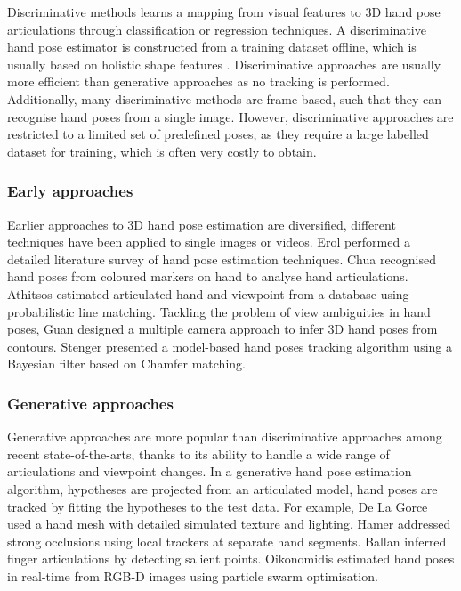 Discriminative methods learns a mapping from visual features to 3D hand pose articulations through classification or regression techniques. A discriminative hand pose estimator is constructed from a training dataset offline, which is usually based on holistic shape features \cite{Rosales2001, Athitsos2003, Romero2009, Wang2009, Keskin2012}. Discriminative approaches are usually more efficient than generative approaches as no tracking is performed. Additionally, many discriminative methods are frame-based, such that they can recognise hand poses from a single image. However, discriminative approaches are restricted to a limited set of predefined poses, as they require a large labelled dataset for training, which is often very costly to obtain.  

\subsubsection{Early approaches} 
Earlier approaches to 3D hand pose estimation are diversified, different techniques have been applied to single images or videos. Erol \etal \cite{Erol2007} performed a detailed literature survey of hand pose estimation techniques. Chua \etal \cite{Chua2002} recognised hand poses from coloured markers on hand to analyse hand articulations. Athitsos \etal \cite{Athitsos2003} estimated articulated hand and viewpoint from a database using probabilistic line matching. Tackling the problem of view ambiguities in hand poses, Guan \etal \cite{Guan2006} designed a multiple camera approach to infer 3D hand poses from contours. Stenger \etal \cite{Stenger2006} presented a model-based hand poses tracking algorithm using a Bayesian filter based on Chamfer matching.  

\subsubsection{Generative approaches} 
Generative approaches are more popular than discriminative approaches among recent state-of-the-arts, thanks to its ability to handle a wide range of articulations and viewpoint changes.   
In a generative hand pose estimation algorithm, hypotheses are projected from an articulated model, hand poses are tracked by fitting the hypotheses to the test data. 
For example, De La Gorce \etal \cite{LaGorce2011} used a hand mesh with detailed simulated texture and lighting. 
Hamer \etal \cite{Hamer2009} addressed strong occlusions using local trackers at separate hand segments. 
Ballan \etal \cite{Ballan2012} inferred finger articulations by detecting salient points.  
Oikonomidis \etal \cite{Oikonomidis2011} estimated hand poses in real-time from RGB-D images using particle swarm optimisation. 

